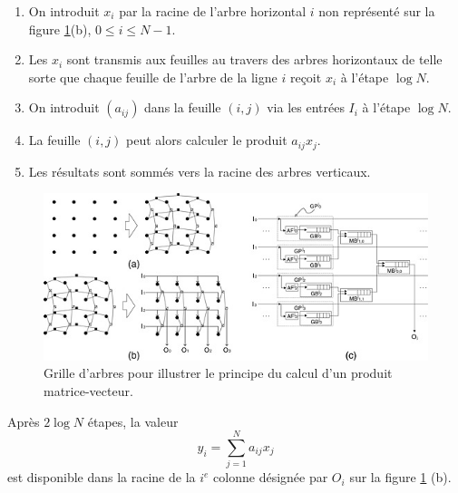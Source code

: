 \begin{enumerate}
 \item On introduit $x_i$ par la racine de l'arbre horizontal $i$ non représenté sur la figure \ref{fig:gda2}(b), $0\leq i\leq N-1$. 
 \item Les $x_i$ sont transmis aux feuilles au travers des arbres horizontaux de telle 
 sorte que chaque feuille de l'arbre de la ligne $i$ 
 reçoit $x_i$ à l'étape $\log N$.
 \item On introduit $(a_{ij})$ dans la feuille $(i,j)$ via les entrées $I_i$ à l'étape $\log N$. 
 \item La feuille $(i,j)$ peut alors calculer le produit $a_{ij}x_j$.
 \item Les résultats sont sommés vers la racine des arbres verticaux.
\end{enumerate}



\begin{figure}[htp]
  \centering
  \includegraphics[width=15cm]{images/gda2}
  \caption{Grille d'arbres pour illustrer le principe du calcul d'un produit matrice-vecteur.}
  \label{fig:gda2}
\end{figure}


Après $2\log N$ étapes, la valeur \[y_i = \sum_{j=1}^{N} a_{ij}x_j\] est disponible dans 
la racine de la $i^{e}$ colonne désignée par $O_i$ sur la figure \ref{fig:gda2} (b). 

